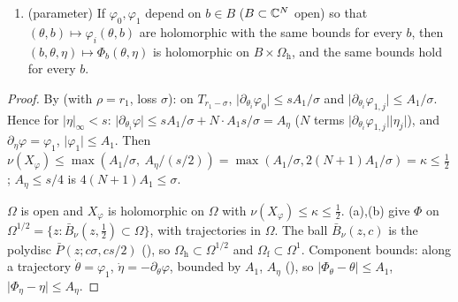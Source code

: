 \begin{lemma}
\begin{enumerate}[label=(\alph*)]
\item (parameter) If $\varphi_0,\varphi_1$ depend on $b\in B$ ($B\subset\mathbb{C}^N$ open) so that $(\theta,b)\mapsto\varphi_i(\theta,b)$ are holomorphic with the same bounds for every $b$, then $(b,\theta,\eta)\mapsto\Phi_b(\theta,\eta)$ is holomorphic on $B\times\Omega_{\mathrm h}$, and the same bounds hold for every $b$.
\end{enumerate}
\end{lemma}
\begin{proof}
\label{stepP:p11a:af-field} By  (with $\rho=r_1$, loss $\sigma$): on $T_{r_1-\sigma}$, $\lvert\partial_{\theta_i}\varphi_0\rvert\le sA_1/\sigma$ and $\lvert\partial_{\theta_i}\varphi_{1,j}\rvert\le A_1/\sigma$. Hence for $\lvert\eta\rvert_\infty<s$: $\lvert\partial_{\theta_i}\varphi\rvert\le sA_1/\sigma+N\cdot A_1 s/\sigma=A_\eta$ ($N$ terms $\lvert\partial_{\theta_i}\varphi_{1,j}\rvert\lvert\eta_j\rvert$), and $\partial_\eta\varphi=\varphi_1$, $\lvert\varphi_1\rvert\le A_1$. Then $\nu(X_\varphi)\le\max(A_1/\sigma,\ A_\eta/(s/2))=\max(A_1/\sigma,2(N+1)A_1/\sigma)=\kappa\le\frac12$; $A_\eta\le s/4$ is $4(N+1)A_1\le\sigma$.

\label{stepP:p11a:af-flow} $\Omega$ is open and $X_\varphi$ is holomorphic on $\Omega$ with $\nu(X_\varphi)\le\kappa\le\frac12$. (a),(b) give $\Phi$ on $\Omega^{1/2}=\{z:\bar B_\nu(z,\frac12)\subset\Omega\}$, with trajectories in $\Omega$. The ball $\bar B_\nu(z,c)$ is the polydisc $\bar P(z;c\sigma,cs/2)$ (), so $\Omega_{\mathrm h}\subset\Omega^{1/2}$ and $\Omega_{\mathrm f}\subset\Omega^1$. Component bounds: along a trajectory $\dot\theta=\varphi_1$, $\dot\eta=-\partial_\theta\varphi$, bounded by $A_1$, $A_\eta$ (), so $\lvert\Phi_\theta-\theta\rvert\le A_1$, $\lvert\Phi_\eta-\eta\rvert\le A_\eta$.


\end{proof}
